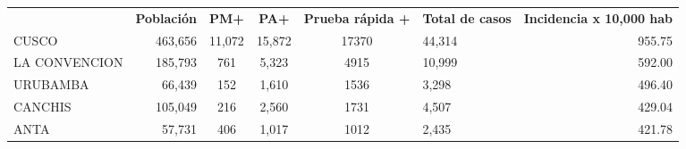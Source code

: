 \begin{tabular}{lrccclr}
	\rowcolor[HTML]{DCE6F1} 
	\multicolumn{1}{c}{\cellcolor[HTML]{DCE6F1}\textbf{PROVINCIA}} & \multicolumn{1}{c}{\cellcolor[HTML]{DCE6F1}\textbf{Población}} & \textbf{PM+}                                                & \textbf{PA+}         & \textbf{Prueba rápida +} & \multicolumn{1}{c}{\cellcolor[HTML]{DCE6F1}\textbf{Total de casos}} & \multicolumn{1}{c}{\cellcolor[HTML]{DCE6F1}\textbf{Incidencia x 10,000 hab}} \\
	\cellcolor[HTML]{FF5050}CUSCO                                  & 463,656                                                        & 11,072                                                      & 15,872               & 17370                    & 44,314                                                              & 955.75                                                                       \\
	\cellcolor[HTML]{F4B084}LA   CONVENCION                        & 185,793                                                        & 761                                                         & 5,323                & 4915                     & 10,999                                                              & 592.00                                                                       \\
	\cellcolor[HTML]{F4B084}URUBAMBA                               & 66,439                                                         & 152                                                         & 1,610                & 1536                     & 3,298                                                               & 496.40                                                                       \\
	\cellcolor[HTML]{FFE699}CANCHIS                                & 105,049                                                        & 216                                                         & 2,560                & 1731                     & 4,507                                                               & 429.04                                                                       \\
	\cellcolor[HTML]{FFE699}ANTA                                   & 57,731                                                         & 406                                                         & 1,017                & 1012                     & 2,435                                                               & 421.78                                                                       \\

\end{tabular}
